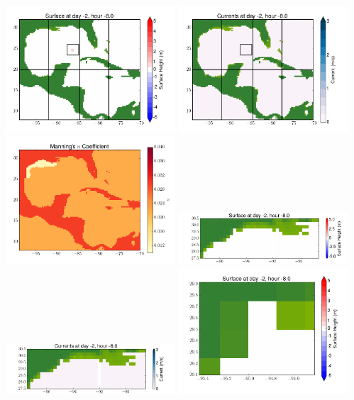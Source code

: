 \documentclass[11pt]{article}
\begin{document}
\vskip 10pt 
\includegraphics[width=0.475\textwidth]{frame0016fig1.png}
\includegraphics[width=0.475\textwidth]{frame0016fig2.png}
\vskip 10pt 
\includegraphics[width=0.475\textwidth]{frame0016fig3.png}
\includegraphics[width=0.475\textwidth]{frame0016fig4.png}
\vskip 10pt 
\includegraphics[width=0.475\textwidth]{frame0016fig5.png}
\includegraphics[width=0.475\textwidth]{frame0016fig6.png}
\end{document}
